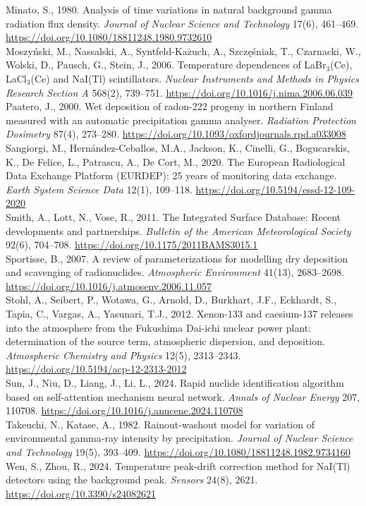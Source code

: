 \documentclass[11pt,a4paper]{article}
\begin{document}
\begin{framed}
\noindent Minato, S., 1980. Analysis of time variations in natural background gamma radiation flux density. \textit{Journal of Nuclear Science and Technology} 17(6), 461--469. \url{https://doi.org/10.1080/18811248.1980.9732610}\\[0.5em]
\noindent Moszyński, M., Nassalski, A., Syntfeld-Każuch, A., Szczęśniak, T., Czarnacki, W., Wolski, D., Pausch, G., Stein, J., 2006. Temperature dependences of LaBr$_3$(Ce), LaCl$_3$(Ce) and NaI(Tl) scintillators. \textit{Nuclear Instruments and Methods in Physics Research Section A} 568(2), 739--751. \url{https://doi.org/10.1016/j.nima.2006.06.039}\\[0.5em]
\noindent Paatero, J., 2000. Wet deposition of radon-222 progeny in northern Finland measured with an automatic precipitation gamma analyser. \textit{Radiation Protection Dosimetry} 87(4), 273--280. \url{https://doi.org/10.1093/oxfordjournals.rpd.a033008}\\[0.5em]
\noindent Sangiorgi, M., Hernández-Ceballos, M.A., Jackson, K., Cinelli, G., Bogucarskis, K., De Felice, L., Patrascu, A., De Cort, M., 2020. The European Radiological Data Exchange Platform (EURDEP): 25 years of monitoring data exchange. \textit{Earth System Science Data} 12(1), 109--118. \url{https://doi.org/10.5194/essd-12-109-2020}\\[0.5em]
\noindent Smith, A., Lott, N., Vose, R., 2011. The Integrated Surface Database: Recent developments and partnerships. \textit{Bulletin of the American Meteorological Society} 92(6), 704--708. \url{https://doi.org/10.1175/2011BAMS3015.1}\\[0.5em]
\noindent Sportisse, B., 2007. A review of parameterizations for modelling dry deposition and scavenging of radionuclides. \textit{Atmospheric Environment} 41(13), 2683--2698. \url{https://doi.org/10.1016/j.atmosenv.2006.11.057}\\[0.5em]
\noindent Stohl, A., Seibert, P., Wotawa, G., Arnold, D., Burkhart, J.F., Eckhardt, S., Tapia, C., Vargas, A., Yasunari, T.J., 2012. Xenon-133 and caesium-137 releases into the atmosphere from the Fukushima Dai-ichi nuclear power plant: determination of the source term, atmospheric dispersion, and deposition. \textit{Atmospheric Chemistry and Physics} 12(5), 2313--2343. \url{https://doi.org/10.5194/acp-12-2313-2012}\\[0.5em]
\noindent Sun, J., Niu, D., Liang, J., Li, L., 2024. Rapid nuclide identification algorithm based on self-attention mechanism neural network. \textit{Annals of Nuclear Energy} 207, 110708. \url{https://doi.org/10.1016/j.anucene.2024.110708}\\[0.5em]
\noindent Takeuchi, N., Katase, A., 1982. Rainout-washout model for variation of environmental gamma-ray intensity by precipitation. \textit{Journal of Nuclear Science and Technology} 19(5), 393--409. \url{https://doi.org/10.1080/18811248.1982.9734160}\\[0.5em]
\noindent Wen, S., Zhou, R., 2024. Temperature peak-drift correction method for NaI(Tl) detectors using the background peak. \textit{Sensors} 24(8), 2621. \url{https://doi.org/10.3390/s24082621}\\[0.5em]
\end{framed}
\end{document}
